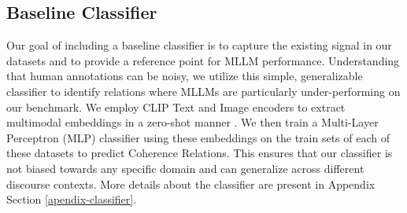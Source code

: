 \subsection{Baseline Classifier} \label{classifier}
Our goal of including a baseline classifier is to capture the existing signal in our datasets and to provide a reference point for MLLM performance. Understanding that human annotations can be noisy, we utilize this simple, generalizable classifier to identify relations where MLLMs are particularly under-performing on our benchmark. We employ CLIP Text and Image encoders to extract multimodal embeddings in a zero-shot manner \cite{Radford2021-ro}. We then train a Multi-Layer Perceptron (MLP) classifier using these embeddings on the train sets of each of these datasets to predict Coherence Relations. This ensures that our classifier is not biased towards any specific domain and can generalize across different discourse contexts. More details about the classifier are present in Appendix Section \ref{apendix-classifier}.